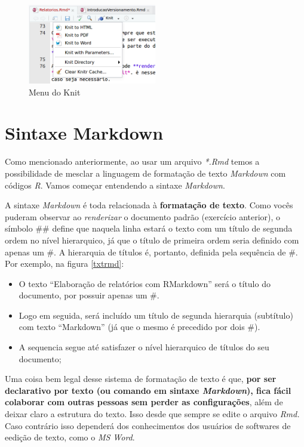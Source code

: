 \documentclass[]{book}
\providecommand{\tightlist}{%
  \setlength{\itemsep}{0pt}\setlength{\parskip}{0pt}}
\begin{document}
\begin{figure}
\centering
\includegraphics[width=0.5\textwidth,height=\textheight]{./img/Knit.png}
\caption{Menu do Knit \label{KnitMenu}}
\end{figure}

\hypertarget{SintaxeMarkdown}{%
\chapter{Sintaxe Markdown}\label{SintaxeMarkdown}}

Como mencionado anteriormente, ao usar um arquivo \emph{*.Rmd} temos a possibilidade de mesclar a linguagem de formatação de texto \emph{Markdown} com códigos \emph{R}. Vamos começar entendendo a sintaxe \emph{Markdown}.

A sintaxe \emph{Markdown} é toda relacionada à \textbf{formatação de texto}. Como vocês puderam observar ao \emph{renderizar} o documento padrão (exercício anterior), o símbolo \#\# define que naquela linha estará o texto com um título de segunda ordem no nível hierarquico, já que o título de primeira ordem seria definido com apenas um \#. A hierarquia de títulos é, portanto, definida pela sequência de \#. Por exemplo, na figura \autoref{txtrmd}:

\begin{itemize}
\tightlist
\item
  O texto ``Elaboração de relatórios com RMarkdown'' será o título do documento, por possuir apenas um \#.
\item
  Logo em seguida, será incluído um título de segunda hierarquia (subtítulo) com texto ``Markdown'' (já que o mesmo é precedido por dois \#).\\
\item
  A sequencia segue até satisfazer o nível hierarquico de títulos do seu documento;
\end{itemize}

Uma coisa bem legal desse sistema de formatação de texto é que, \textbf{por ser declarativo por texto (ou comando em sintaxe \emph{Markdown}), fica fácil colaborar com outras pessoas sem perder as configurações}, além de deixar claro a estrutura do texto. Isso desde que sempre se edite o arquivo \emph{Rmd.} Caso contrário isso dependerá dos conhecimentos dos usuários de softwares de eedição de texto, como o \emph{MS Word}.
\end{document}
